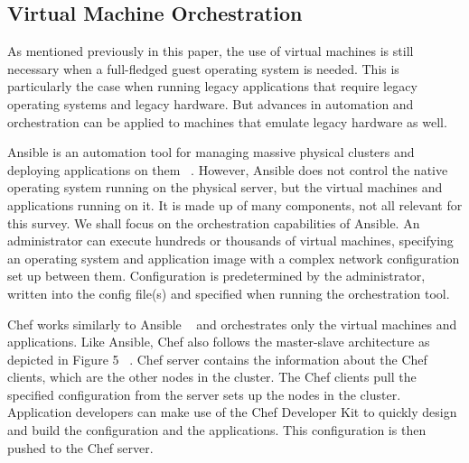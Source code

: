 \documentclass[10pt,twocolumn]{article}
\begin{document}
\subsection{Virtual Machine Orchestration}

As mentioned previously in this paper, the use of virtual machines is still necessary when a full-fledged guest operating system is needed.
This is particularly the case when running legacy applications that require legacy operating systems and legacy hardware.
But advances in automation and orchestration can be applied to machines that emulate legacy hardware as well.

Ansible is an automation tool for managing massive physical clusters and deploying applications on them ~\cite{ansible}.
However, Ansible does not control the native operating system running on the physical server, but the virtual machines and applications running on it.
It is made up of many components, not all relevant for this survey.
We shall focus on the orchestration capabilities of Ansible.
An administrator can execute hundreds or thousands of virtual machines, specifying an operating system and application image with a complex network configuration set up between them.
Configuration is predetermined by the administrator, written into the config file(s) and specified when running the orchestration tool.

Chef works similarly to Ansible ~\cite{chef} and orchestrates only the virtual machines and applications.
Like Ansible, Chef also follows the master-slave architecture as depicted in Figure 5 ~\cite{chef_overiew}.
Chef server contains the information about the Chef clients, which are the other nodes in the cluster.
The Chef clients pull the specified configuration from the server sets up the nodes in the cluster.
Application developers can make use of the Chef Developer Kit to quickly design and build the configuration and the applications.
This configuration is then pushed to the Chef server.
\end{document}

